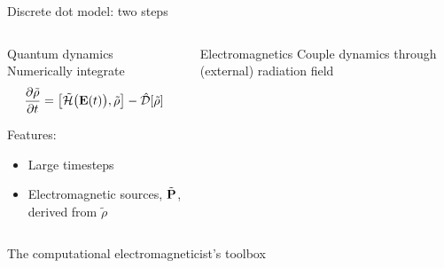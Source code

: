 \documentclass[aspectratio=169, usenames, dvipsnames]{beamer}
\begin{document}
\begin{frame}{Discrete dot model: two steps}
  \begin{columns}
    \begin{column}{0.5\textwidth}
      \begin{block}{Quantum dynamics}
        Numerically integrate
        \begin{equation*}
          \pdv{\tilde{\rho}}{t} = \commutator{\tilde{\mathcal{H}}\qty\big(\vb{E}(t))}{\tilde{\rho}} - \hat{\mathcal{D}}\qty[\tilde{\rho}]
        \end{equation*}

        Features:
        \begin{itemize}
          \item Large timesteps
          \item Electromagnetic sources, $\tilde{\vb{P}}$, derived from $\tilde{\rho}$
        \end{itemize}
      \end{block}
    \end{column}

    \begin{column}{0.5\textwidth}
      \begin{block}{Electromagnetics}
        Couple dynamics through (external) radiation field 
      \end{block}
    \end{column}
  \end{columns}
\end{frame}

\begin{frame}{The computational electromagneticist's toolbox}
    \vspace{-0.5cm}
      \begin{center}
        
      \end{center}
    \vspace{-1cm}
\end{frame}
\end{document}
